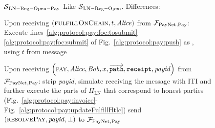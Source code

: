 \begin{figure}[H]
  \begin{simulatorbox}{$\mathcal{S}{}_{\mathrm{LN - Reg - Open - Pay}}$}
    Like $\mathcal{S}{}_{\mathrm{LN - Reg - Open}}$. Differences:
    \begin{algorithmic}[1]
      \State Upon receiving $\left(\textsc{fulfillOnChain}, t, \mathit{Alice}\right)$
      from $\mathcal{F}_{\mathrm{PayNet}}{}_{\mathrm{, Pay}}$:
      \Indent
        \State Execute
        lines~\ref{alg:protocol:pay:foc:tosubmit}-\ref{alg:protocol:pay:foc:submit}
        of Fig.~\ref{alg:protocol:pay:push} as \alice{}, using $t$ from message
      \EndIndent
      \Statex

      \State Upon receiving $\left(\textsc{pay}, \mathit{Alice}, \mathit{Bob}, x,
      \overrightarrow{\mathtt{path}}, \mathtt{receipt}, \mathit{payid}\right)$
      from $\mathcal{F}_{\mathrm{PayNet}}{}_{\mathrm{, Pay}}$:
      \Indent
        \State strip \textit{payid}, simulate receiving the message with
        \alice{} ITI and further execute the parts of $\Pi_{\mathrm{LN}}$ that
        correspond to honest parties (Fig.~\ref{alg:protocol:pay:invoice}-
        Fig.~\ref{alg:protocol:pay:updateFulfillHtlc})
         
          \State send $\left(\textsc{resolvePay}, \mathit{payid}, \bot\right)$
          to $\mathcal{F}_{\mathrm{PayNet}}{}_{\mathrm{, Pay}}$
        \EndIf
      \EndIndent
      \Statex


\end{algorithmic}
\end{simulatorbox}
\end{figure}

